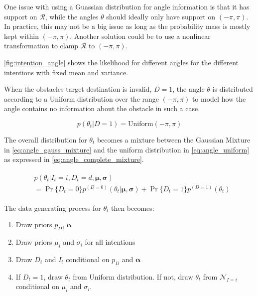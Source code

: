 One issue with using a Guassian distribution for angle information is that it has support on $\mathcal{R}$, while the angles $\theta$ should ideally only have support on $(-\pi, \pi)$. In practice, this may not be a big issue as long as the probability mass is mostly kept within $(-\pi, \pi)$. Another solution could be to use a nonlinear transformation to clamp $\mathcal{R}$ to $(-\pi, \pi)$.

\cref{fig:intention_angle} shows the likelihood for different angles for the different intentions with fixed mean and variance. 

When the obstacles target destination is invalid, $D=1$, the angle $\theta$ is distributed according to a Uniform distribution over the range $(-\pi, \pi)$ to model how the angle contains no information about the obstacle in such a case. 

\begin{equation}\label{eq:angle_uniform}
    p(\theta_t | D=1) = \text{Uniform}(-\pi, \pi)
\end{equation}

The overall distribution for $\theta_t$ becomes a mixture between the Gaussian Mixture in \cref{eq:angle_gauss_mixture} and the uniform distribution in  \cref{eq:angle_uniform} as expressed in \cref{eq:angle_complete_mixture}.

\begin{align}\label{eq:angle_complete_mixture}
\begin{split}
     &p(\theta_t | I_t=i, D_t=d, \boldsymbol{\mu}, \boldsymbol{\sigma})\\
     &= \Pr\{D_t = 0\} p^{(D=0)}(\theta_t | \boldsymbol{\mu}, \boldsymbol{\sigma}) + \Pr\{D_t=1\}p^{(D=1)}(\theta_t)
\end{split}
\end{align}


The data generating process for $\theta_t$ then becomes:

\begin{enumerate}
    \item Draw priors $p_D$, $\boldsymbol{\alpha}$ 
    \item Draw priors $\mu_i$ and $\sigma_i$ for all intentions 
    \item Draw $D_t$ and $I_t$ conditional on $p_D$ and $\boldsymbol{\alpha}$
    \item If $D_t=1$, draw $\theta_t$ from Uniform distribution. If not, draw $\theta_t$ from $\mathcal{N}_{I=i}$ conditional on $\mu_i$ and $\sigma_i$.
\end{enumerate}


